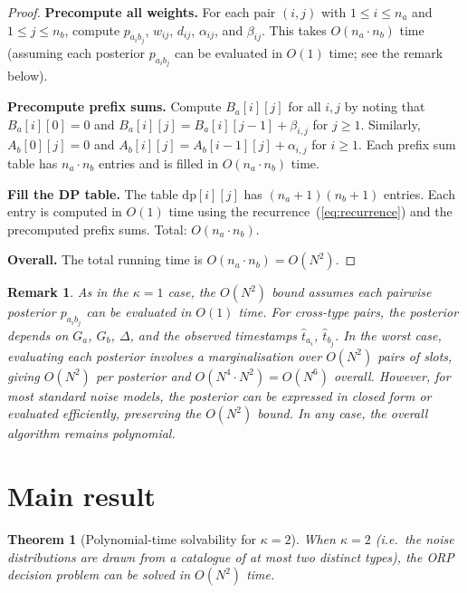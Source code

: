 \documentclass[11pt]{article}
\newtheorem{theorem}{Theorem}
\newtheorem*{remark}{Remark}
\begin{document}
\begin{proof}
\textbf{Precompute all weights.} For each pair $(i, j)$ with $1 \le i \le n_a$ and $1 \le j \le n_b$, compute $p_{a_i b_j}$, $w_{ij}$, $d_{ij}$, $\alpha_{ij}$, and $\beta_{ij}$. This takes $O(n_a \cdot n_b)$ time (assuming each posterior $p_{a_i b_j}$ can be evaluated in $O(1)$ time; see the remark below).

\textbf{Precompute prefix sums.} Compute $B_a[i][j]$ for all $i, j$ by noting that $B_a[i][0] = 0$ and $B_a[i][j] = B_a[i][j-1] + \beta_{i,j}$ for $j \ge 1$. Similarly, $A_b[0][j] = 0$ and $A_b[i][j] = A_b[i-1][j] + \alpha_{i,j}$ for $i \ge 1$. Each prefix sum table has $n_a \cdot n_b$ entries and is filled in $O(n_a \cdot n_b)$ time.

\textbf{Fill the DP table.} The table $\mathrm{dp}[i][j]$ has $(n_a + 1)(n_b + 1)$ entries. Each entry is computed in $O(1)$ time using the recurrence~(\ref{eq:recurrence}) and the precomputed prefix sums. Total: $O(n_a \cdot n_b)$.

\textbf{Overall.} The total running time is $O(n_a \cdot n_b) = O(N^2)$.
\end{proof}

\begin{remark}
As in the $\kappa = 1$ case, the $O(N^2)$ bound assumes each pairwise posterior $p_{a_i b_j}$ can be evaluated in $O(1)$ time. For cross-type pairs, the posterior depends on $G_a$, $G_b$, $\Delta$, and the observed timestamps $\hat{t}_{a_i}$, $\hat{t}_{b_j}$. In the worst case, evaluating each posterior involves a marginalisation over $O(N^2)$ pairs of slots, giving $O(N^2)$ per posterior and $O(N^4 \cdot N^2) = O(N^6)$ overall. However, for most standard noise models, the posterior can be expressed in closed form or evaluated efficiently, preserving the $O(N^2)$ bound. In any case, the overall algorithm remains polynomial.
\end{remark}

\section{Main result}

\begin{theorem}[Polynomial-time solvability for $\kappa = 2$]\label{thm:main}
When $\kappa = 2$ (i.e.\ the noise distributions are drawn from a catalogue of at most two distinct types), the ORP decision problem can be solved in $O(N^2)$ time.
\end{theorem}
\end{document}
